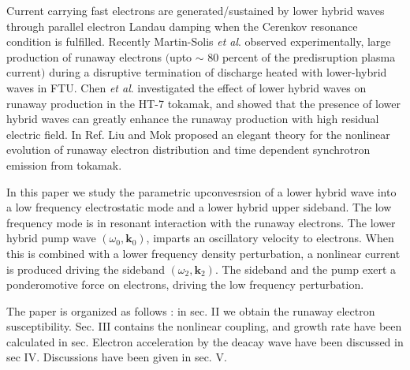 \documentclass[aip,pop,amsmath,amssymb,showpacs,reprint,floatfix,lengthcheck]{revtex4-1}
\begin{document}
Current carrying fast electrons are generated/sustained by lower hybrid waves through parallel electron Landau damping when the Cerenkov resonance condition is fulfilled. Recently Martin-Solis \textit{et al}.\cite{PhysRevLett.97.165002} observed experimentally,  large production of runaway electrons $($upto $\sim$ 80 percent of the predisruption plasma current$)$ during a disruptive termination of discharge heated with lower-hybrid waves in FTU. Chen \textit{et al}.\cite{chen2006dynamics} investigated the effect of lower hybrid waves on runaway production in the HT-7 tokamak, and showed that the presence of lower hybrid waves can greatly enhance the runaway production with high residual electric field.  In Ref.\cite{PhysRevLett.38.162} Liu and Mok proposed an elegant theory for the nonlinear evolution of runaway electron distribution and time dependent synchrotron emission from tokamak. 

In this paper we study the parametric upconvesrsion of a lower hybrid wave into a low frequency electrostatic mode and a lower hybrid upper sideband. The low frequency mode is in resonant interaction with the runaway electrons. The lower hybrid pump wave $(\omega_{0}, \textbf{k}_{0})$, imparts an oscillatory velocity to electrons. When this is combined with a lower frequency density perturbation, a nonlinear current is produced driving the sideband $(\omega_{2}, \textbf{k}_{2})$. The sideband and the pump exert a ponderomotive force on electrons, driving the low frequency perturbation.

The paper is organized as follows : in sec. II we obtain the runaway electron susceptibility. Sec. III contains the nonlinear coupling, and growth rate have been calculated in sec. Electron acceleration by the deacay wave have been discussed in sec IV. Discussions have been given in sec. V.
\end{document}
